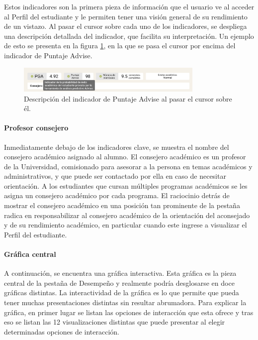 Estos indicadores son la primera pieza de información que el usuario ve al acceder al Perfil del estudiante y le permiten tener una visión general de su rendimiento de un vistazo. Al pasar el cursor sobre cada uno de los indicadores, se despliega una descripción detallada del indicador, que facilita su interpretación. Un ejemplo de esto se presenta en la figura \ref{fig:indicadores}, en la que se pasa el cursor por encima del indicador de Puntaje Advise.

\begin{figure}[H]
	\centering
	\includegraphics[width=0.8\textwidth]{assets/nes/indicadores.png}
	\caption{Descripción del indicador de Puntaje Advise al pasar el cursor sobre él.}
	\label{fig:indicadores}
\end{figure}

\paragraph{Profesor consejero} Inmediatamente debajo de los indicadores clave, se muestra el nombre del consejero académico asignado al alumno. El consejero académico es un profesor de la Universidad, comisionado para asesorar a la persona en temas académicos y administrativos, y que puede ser contactado por ella en caso de necesitar orientación. A los estudiantes que cursan múltiples programas académicos se les asigna un consejero académico por cada programa. El raciocinio detrás de mostrar el consejero académico en una posición tan prominente de la pestaña radica en responsabilizar al consejero académico de la orientación del aconsejado y de su rendimiento académico, en particular cuando este ingrese a visualizar el Perfil del estudiante.

\paragraph{Gráfica central} A continuación, se encuentra una gráfica interactiva. Esta gráfica es la pieza central de la pestaña de Desempeño y realmente podría desglosarse en doce gráficas distintas. La interactividad de la gráfica es lo que permite que pueda tener muchas presentaciones distintas sin resultar abrumadora. Para explicar la gráfica, en primer lugar se listan las opciones de interacción que esta ofrece y tras eso se listan las 12 visualizaciones distintas que puede presentar al elegir determinadas opciones de interacción.

